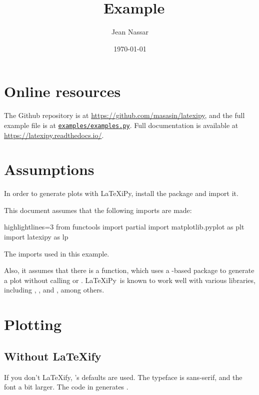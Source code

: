 \documentclass[10pt]{article}
\title{\latexipy\ Example}
\author{Jean Nassar}
\date{\today}
\newcommand\latexipy{\LaTeX iPy}
\newcommand\latexify{\LaTeX ify}
\begin{document}
\maketitle
\tableofcontents
\listoflistings
\listoffigures

\section{Online resources}
The Github repository is at \url{https://github.com/masasin/latexipy},
and the full example file is at \href{https://github.com/masasin/latexipy/blob/master/examples/examples.py}{\texttt{examples/examples.py}}.
Full documentation is available at \url{https://latexipy.readthedocs.io/}.

\section{Assumptions}
In order to generate plots with \latexipy, install the package and import it.

This document assumes that the following imports are made:

\begin{listing}[H]
  \begin{pycode*}{highlightlines=3}
    from functools import partial
    import matplotlib.pyplot as plt
    import latexipy as lp
  \end{pycode*}
  \caption[List of imports]{The imports used in this example.}
  \label{lst:imports}
\end{listing}

Also, it assumes that there is a function,  which uses a -based package to generate a plot without calling  or .
\latexipy\ is known to work well with various libraries, including , ,  and , among others.

\section{Plotting}
\subsection{Without \latexify}
If you don't \latexify, 's defaults are used.
The typeface is sans-serif, and the font a bit larger.
The code in  generates .
\end{document}
